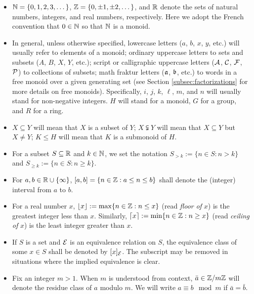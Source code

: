 \begin{itemize}
	\item $\NN = \{0,1,2,3,\dots\}$, $\ZZ = \{0,\pm 1, \pm 2,\dots\}$, and $\RR$ denote the sets of natural numbers, integers, and real numbers, respectively.
	Here we adopt the French convention that $0\in \NN$ so that $\NN$ is a monoid.
	
	\item In general, unless otherwise specified, lowercase letters ($a$, $b$, $x$, $y$, etc.) will usually refer to elements of a monoid; 
	ordinary uppercase letters to sets and subsets ($A$, $B$, $X$, $Y$, etc.); 
	script or calligraphic uppercase letters ($\A$, $\C$, $\F$, $\P$) to collections of subsets; 
	math fraktur letters ($\aa$, $\bb$, etc.) to words in a free monoid over a given generating set 
	(see Section \ref{subsec:factorizations} for more details on free monoids).
	Specifically, $i$, $j$, $k$, $\ell$, $m$, and $n$ will usually stand for non-negative integers. 
	$H$ will stand for a monoid, $G$ for a group, and $R$ for a ring.
	
	\item $X\subseteq Y$ will mean that $X$ is a subset of $Y$; $X\subsetneqq Y$ will mean that $X\subseteq Y$ but $X\neq Y$; $K\le H$ will mean that $K$ is a submonoid of $H$.
	
	\item For a subset $S\subseteq \RR$ and $k\in \NN$, we set the notation $S_{>k} := \{n\in S: n>k\}$ and $S_{\ge k} := \{n\in S: n\ge k\}$.
	
	\item For $a, b\in \RR\cup\{\infty\}$, $[ a,b ] = \{ n\in \ZZ : a \le n \le b \}$ shall denote the (integer) interval from $a$ to $b$.
	
	\item For a real number $x$, $\lfloor x \rfloor := \max\{n\in \ZZ: n \le x\}$ (read \textit{floor of} $x$) is the greatest integer less than $x$.
	Similarly, $\lceil x \rceil := \min\{n\in \ZZ: n\ge x\}$ (read \textit{ceiling of} $x$) is the least integer greater than $x$.
	
	\item If $S$ is a set and $\E$ is an equivalence relation on $S$, the equivalence class of some $x\in S$ shall be denoted by $[x]_\E$.
	The subscript may be removed in situations where the implied equivalence is clear.
	
	\item Fix an integer $m>1$.  When $m$ is understood from context, $\bar{a} \in \ZZ/m\ZZ$ will denote the residue class of $a$ modulo $m$.
	We will write $a\equiv b \mod m$ if $\bar{a} = \bar{b}$.
	

\end{itemize}

